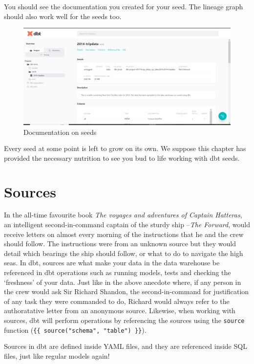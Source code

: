 \documentclass[
]{book}
\begin{document}
You should see the documentation you created for your seed. The lineage graph should also work well for the seeds too.

\begin{figure}
\centering
\includegraphics{./images/seed_documentation.png}
\caption{Documentation on seeds}
\end{figure}

Every seed at some point is left to grow on its own. We suppose this chapter has provided the necessary nutrition to see you bud to life working with dbt seeds.

\hypertarget{sources-1}{%
\chapter{Sources}\label{sources-1}}

In the all-time favourite book \emph{The voyages and adventures of Captain Hatteras}, an intelligent second-in-command captain of the sturdy ship --\emph{The Forward}, would receive letters on almost every morning of the instructions that he and the crew should follow. The instructions were from an unknown source but they would detail which bearings the ship should follow, or what to do to navigate the high seas. In dbt, sources are what make your data in the data warehouse be referenced in dbt operations such as running models, tests and checking the `freshness' of your data.
Just like in the above anecdote where, if any person in the crew would ask Sir Richard Shandon, the second-in-command for justification of any task they were commanded to do, Richard would always refer to the authoratative letter from an anonymous source. Likewise, when working with sources, dbt will perform operations by referencing the sources using the \texttt{source} function (\texttt{\{\{\ source("schema",\ "table")\ \}\}}).

Sources in dbt are defined inside YAML files, and they are referenced inside SQL files, just like regular models again!
\end{document}
